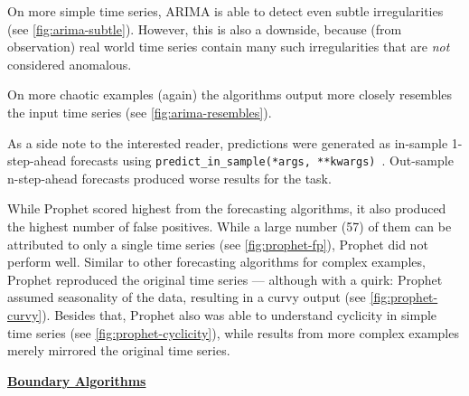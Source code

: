 \begin{description}[style=unboxed,leftmargin=0cm]
    On more simple time series, ARIMA is able to detect even subtle irregularities
    (see \cref{fig:arima-subtle}). However, this is also a downside, because
    (from observation) real world time series contain many such irregularities
    that are \textit{not} considered anomalous.
    
    On more chaotic examples (again) the algorithms output more closely resembles
    the input time series (see \cref{fig:arima-resembles}).
    
    As a side note to the interested reader, predictions were generated as in-sample
    1-step-ahead forecasts using \mbox{\texttt{predict\_in\_sample(*args, **kwargs)}~\cite{Smith.2017}}.
    Out-sample n-step-ahead forecasts produced worse results for the task.
    \item[Prophet] While Prophet scored highest from the forecasting algorithms,
    it also produced the highest number of false positives. While a large number
    (57) of them can be attributed to only a single time series (see \cref{fig:prophet-fp}),
    Prophet did not perform well. Similar to other forecasting algorithms for complex examples, Prophet
    reproduced the original time series --- although with a quirk: Prophet
    assumed seasonality of the data, resulting in a curvy output (see \cref{fig:prophet-curvy}).
    Besides that, Prophet also was able to understand cyclicity in simple time series
    (see \cref{fig:prophet-cyclicity}), while results from more complex examples merely mirrored
    the original time series.
\end{description}
\bigskip
{\large\uline{\textbf{Boundary Algorithms}}}\\
